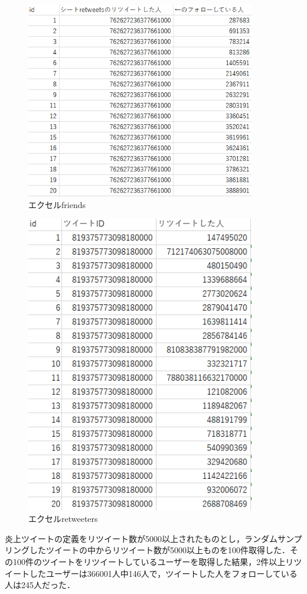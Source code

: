 \begin{figure}[htb]
\centering
\includegraphics[width=10cm]{excel_friends.png}
\caption{エクセルfriends}\label{excel_friends}
\end{figure}
\clearpage
\begin{figure}[htb]
\centering
\includegraphics[width=10cm]{excel_retweeters.png}
\caption{エクセルretweeters}\label{excel_retweeters}
\end{figure}
\clearpage

炎上ツイートの定義をリツイート数が5000以上されたものとし，ランダムサンプリングしたツイートの中からリツイート数が5000以上ものを100件取得した．その100件のツイートをリツイートしているユーザーを取得した結果，2件以上リツイートしたユーザーは366001人中146人で，ツイートした人をフォローしている人は245人だった．
\clearpage

